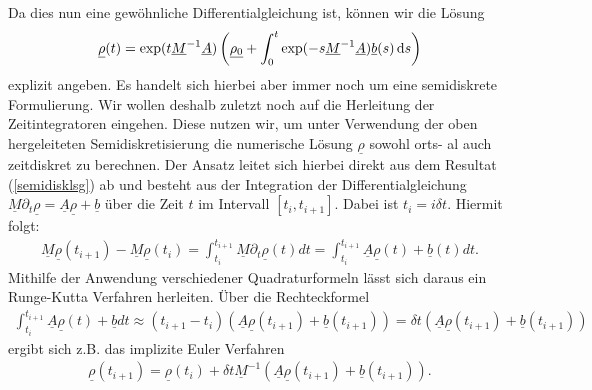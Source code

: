 Da dies nun eine gewöhnliche Differentialgleichung ist, können wir die Lösung 
\begin{align}
 \label{semidisklsg}
 \underline{\rho}(t) = \exp(t \underline{M}^{-1} \underline{A}) \left( \underline{\rho_0} + \int_{0}^{t} \exp(-s\underline{M}^{-1} \underline{A}) \underline{b}(s) \, \mathrm{d} s \right)
\end{align}
explizit angeben.
Es handelt sich hierbei aber immer noch um eine semidiskrete Formulierung. 
Wir wollen deshalb zuletzt noch auf die Herleitung der Zeitintegratoren eingehen. Diese nutzen wir, um unter Verwendung der oben hergeleiteten Semidiskretisierung die numerische Lösung $ \underline{\rho} $ sowohl orts- al auch zeitdiskret zu berechnen. Der Ansatz leitet sich hierbei direkt aus dem Resultat (\ref{semidisklsg}) ab und besteht aus der 
Integration der Differentialgleichung $\underline{M} \partial_t \underline{\rho} = \underline{A} \underline{\rho} + \underline{b}$ über die Zeit $t$ im Intervall $[t_i, t_{i+1}]$.
Dabei ist $t_i = i \delta t$. Hiermit folgt:
\begin{align*}
\underline{M}\underline{\rho}(t_{i+1}) - \underline{M}\underline{\rho}(t_i) = \int_{t_i}^{t_{i+1}}
\underline{M} \partial_t \underline{\rho}(t) dt =\int_{t_i}^{t_{i+1}} \underline{A} \underline{\rho}(t) + \underline{b}(t) dt.
\end{align*}
Mithilfe der Anwendung verschiedener Quadraturformeln lässt sich daraus ein Runge-Kutta Verfahren herleiten. Über die Rechteckformel 
\begin{align*}
\int_{t_i}^{t_{i+1}}\underline{A} \underline{\rho}(t) + \underline{b} dt \approx (t_{i+1}-t_i)( 
\underline{A} \underline{\rho}(t_{i+1}) + \underline{b}(t_{i+1})) = \delta t (\underline{A} \underline{\rho}(t_{i+1}) + \underline{b}(t_{i+1}))
\end{align*}
ergibt sich z.B. das implizite Euler Verfahren
\begin{align*}
\underline{\rho}(t_{i+1}) = \underline{\rho}(t_{i}) + \delta t \underline{M}^{-1}(\underline{A} \underline{\rho}(t_{i+1}) + \underline{b}(t_{i+1})).
\end{align*}
